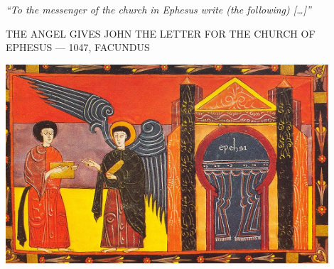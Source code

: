 \clearpage
\thispagestyle{empty}
\null\vfill
\settowidth{}
\begin{center}
\parbox{\longest}{%
  \raggedright{\huge\itshape%
    ``To the messenger of the church in Ephesus write (the following) […]'' \par\bigskip
  }
  \raggedleft\Large\MakeUppercase{The Angel gives John the Letter for the Church of Ephesus — 1047, Facundus}\par%
}
\vfill\vfill
\clearpage\newpage
\end{center}
\newpage
\thispagestyle{empty}
\begin{center}
	\includegraphics[angle=90, width=0.9\textwidth]{images/illustrations/letterephesus.jpg}
\end{center}